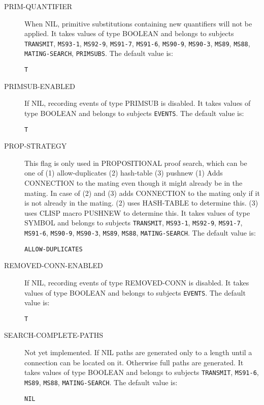 \begin{description}
\item[PRIM-QUANTIFIER]  
When NIL, primitive substitutions containing new quantifiers will
not be applied.
It takes values of type BOOLEAN and belongs to subjects \texttt{TRANSMIT}, \texttt{MS93-1}, \texttt{MS92-9}, \texttt{MS91-7}, \texttt{MS91-6}, \texttt{MS90-9}, \texttt{MS90-3}, \texttt{MS89}, \texttt{MS88}, \texttt{MATING-SEARCH}, \texttt{PRIMSUBS}.  The default value is: \begin{lstlisting}
T
\end{lstlisting}

\item[PRIMSUB-ENABLED]  
If NIL, recording events of type PRIMSUB is disabled.
It takes values of type BOOLEAN and belongs to subjects \texttt{EVENTS}.  The default value is: \begin{lstlisting}
T
\end{lstlisting}

\item[PROP-STRATEGY]  
This flag is only used in PROPOSITIONAL proof search, which can 
    be one of (1) allow-duplicates (2) hash-table (3) pushnew
    (1) Adds CONNECTION to the mating even though it might already be in the
    mating.
    In case of (2) and (3) adds CONNECTION to the mating only if it is not
    already in the mating.
    (2) uses HASH-TABLE to determine this.
    (3) uses CLISP macro PUSHNEW to determine this.
It takes values of type SYMBOL and belongs to subjects \texttt{TRANSMIT}, \texttt{MS93-1}, \texttt{MS92-9}, \texttt{MS91-7}, \texttt{MS91-6}, \texttt{MS90-9}, \texttt{MS90-3}, \texttt{MS89}, \texttt{MS88}, \texttt{MATING-SEARCH}.  The default value is: \begin{lstlisting}
ALLOW-DUPLICATES
\end{lstlisting}

\item[REMOVED-CONN-ENABLED]  
If NIL, recording events of type REMOVED-CONN is disabled.
It takes values of type BOOLEAN and belongs to subjects \texttt{EVENTS}.  The default value is: \begin{lstlisting}
T
\end{lstlisting}

\item[SEARCH-COMPLETE-PATHS]  
Not yet implemented.
If NIL paths are generated only to a length until a connection can be
located on it. Otherwise full paths are generated.
It takes values of type BOOLEAN and belongs to subjects \texttt{TRANSMIT}, \texttt{MS91-6}, \texttt{MS89}, \texttt{MS88}, \texttt{MATING-SEARCH}.  The default value is: \begin{lstlisting}
NIL
\end{lstlisting}


\end{description}
